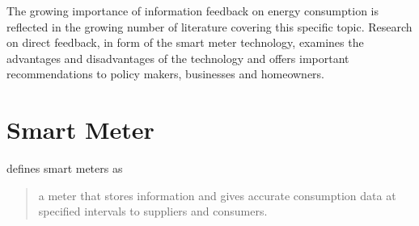 %
%

% 

The growing importance of information feedback on energy consumption is reflected in the growing number of literature covering this specific topic. Research on direct feedback, in form of the smart meter technology, examines the advantages and disadvantages of the technology and offers important recommendations to policy makers, businesses and homeowners.

\section{Smart Meter}
\label{ch:Content1:sec:Smart Meter}
\citep{Darby2008} defines smart meters as \begin{quotation}
a meter that stores information and gives accurate consumption data at specified intervals to suppliers and consumers.
\end{quotation}

